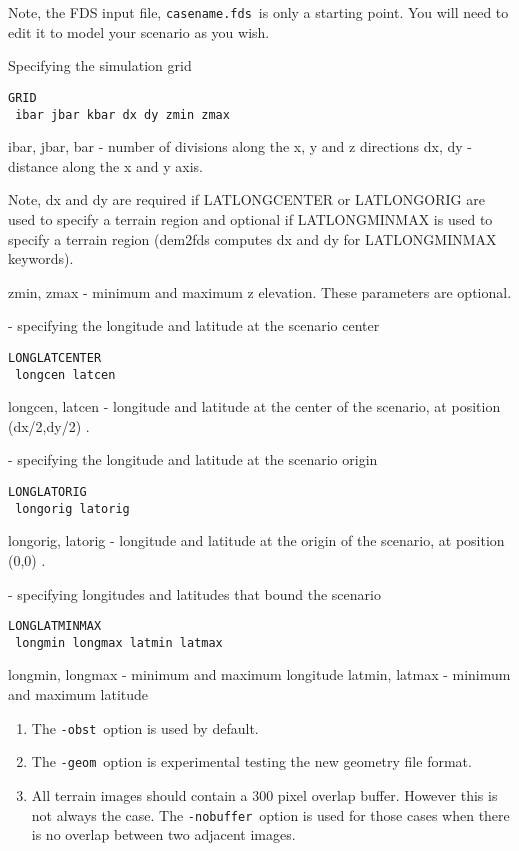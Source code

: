 Note, the FDS input file, {\tt casename.fds}\ is only a starting point.  You will need to
edit it to model your scenario as you wish.


\blist
{} Specifying the simulation grid
\begin{verbatim}
GRID
 ibar jbar kbar dx dy zmin zmax
\end{verbatim}

ibar, jbar, bar - number of divisions along the x, y and z directions
dx, dy - distance along the x and y axis.

Note, dx and dy are required if LATLONGCENTER or
LATLONGORIG are used to specify a terrain region and
optional if LATLONGMINMAX is used to specify a terrain region (dem2fds computes
dx and dy for LATLONGMINMAX keywords).

zmin, zmax - minimum and maximum z elevation.  These parameters are optional.


 - specifying the longitude and latitude at the scenario center

\begin{verbatim}
LONGLATCENTER
 longcen latcen
\end{verbatim}


longcen, latcen - longitude and latitude at the center of the scenario, at
position (dx/2,dy/2) .

- specifying the longitude and latitude at the scenario origin
\begin{verbatim}
LONGLATORIG
 longorig latorig
\end{verbatim}


longorig, latorig - longitude and latitude at the origin of the scenario, at
position (0,0) .

 - specifying longitudes and latitudes that bound the scenario
\begin{verbatim}
LONGLATMINMAX
 longmin longmax latmin latmax
\end{verbatim}


longmin, longmax - minimum and maximum longitude
latmin, latmax - minimum and maximum latitude

\elist




\begin{enumerate}
\item The {\tt -obst}\ option is used by default.
\item The {\tt -geom}\ option is experimental testing the new geometry file format.
\item All terrain images should contain a 300 pixel overlap buffer.  However
this is not always the case.  The {\tt -nobuffer}\ option is used for those
cases when there is no overlap between two adjacent images.
\end{enumerate}


